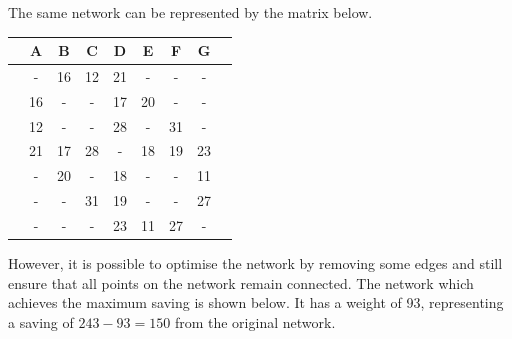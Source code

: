 The same network can be represented by the matrix below.

\begin{center}
    \begin{tabular}{|l|*{8}{c|}}
        \hline
        \rowcolor{lightgray} & A & B & C & D & E & F & G\\
        \hline
        \cellcolor{lightgray}{A} & - & 16 & 12 & 21 & - & - & -\\
        \hline
        \cellcolor{lightgray}{B} & 16 & - & - & 17 & 20 & - & -\\
        \hline
        \cellcolor{lightgray}{C} & 12 & - & - & 28 & - & 31 & -\\
        \hline
        \cellcolor{lightgray}{D} & 21 & 17 & 28 & - & 18 & 19 & 23\\
        \hline
        \cellcolor{lightgray}{E} & - & 20 & - & 18 & - & - & 11\\
        \hline
        \cellcolor{lightgray}{F} & - & - & 31 & 19 & - & - & 27\\
        \hline
        \cellcolor{lightgray}{G} & - & - & - & 23 & 11 & 27 & -\\
        \hline
    \end{tabular}
\end{center}


However, it is possible to optimise the network by removing some edges and still ensure that all points on the network remain connected. The network which achieves the maximum saving is shown below. It has a weight of 93, representing a saving of $243 - 93 = 150$ from the original network.

\begin{center}
\end{center}

